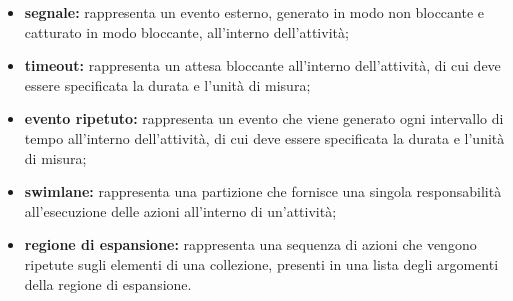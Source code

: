 \begin{itemize}
							\item \textbf{segnale:} rappresenta un evento esterno, generato in modo non bloccante e catturato in modo bloccante, all'interno dell'attività;
							\item \textbf{timeout:} rappresenta un attesa bloccante all'interno dell'attività, di cui deve essere specificata la durata e l'unità di misura;
							\item \textbf{evento ripetuto:} rappresenta un evento che viene generato ogni intervallo di tempo all'interno dell'attività, di cui deve essere specificata la durata e l'unità di misura;
							\item \textbf{swimlane:} rappresenta una partizione che fornisce una singola responsabilità all'esecuzione delle azioni all'interno di un'attività;
							\item \textbf{regione di espansione:} rappresenta una sequenza di azioni che vengono ripetute sugli elementi di una collezione, presenti in una lista degli argomenti della regione di espansione.
						\end{itemize}

